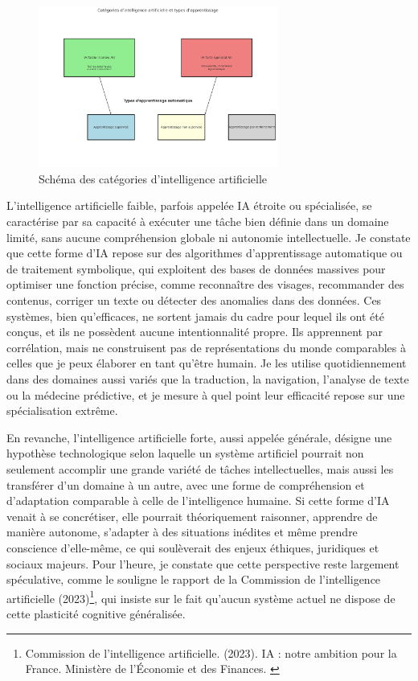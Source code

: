 \documentclass[11pt,a4paper]{report}
\begin{document}
\begin{figure}[h]
    \centering
    \includegraphics[width=0.7\textwidth]{images/2.1.1.png}
    \caption{Schéma des catégories d’intelligence artificielle}
    \label{fig:2.1.1}
\end{figure}

L’intelligence artificielle faible, parfois appelée IA étroite ou spécialisée, se caractérise par sa capacité à exécuter une tâche bien définie dans un domaine limité, sans aucune compréhension globale ni autonomie intellectuelle. Je constate que cette forme d’IA repose sur des algorithmes d’apprentissage automatique ou de traitement symbolique, qui exploitent des bases de données massives pour optimiser une fonction précise, comme reconnaître des visages, recommander des contenus, corriger un texte ou détecter des anomalies dans des données. Ces systèmes, bien qu’efficaces, ne sortent jamais du cadre pour lequel ils ont été conçus, et ils ne possèdent aucune intentionnalité propre. Ils apprennent par corrélation, mais ne construisent pas de représentations du monde comparables à celles que je peux élaborer en tant qu’être humain. Je les utilise quotidiennement dans des domaines aussi variés que la traduction, la navigation, l’analyse de texte ou la médecine prédictive, et je mesure à quel point leur efficacité repose sur une spécialisation extrême.

En revanche, l’intelligence artificielle forte, aussi appelée générale, désigne une hypothèse technologique selon laquelle un système artificiel pourrait non seulement accomplir une grande variété de tâches intellectuelles, mais aussi les transférer d’un domaine à un autre, avec une forme de compréhension et d’adaptation comparable à celle de l’intelligence humaine. Si cette forme d’IA venait à se concrétiser, elle pourrait théoriquement raisonner, apprendre de manière autonome, s’adapter à des situations inédites et même prendre conscience d’elle-même, ce qui soulèverait des enjeux éthiques, juridiques et sociaux majeurs. Pour l’heure, je constate que cette perspective reste largement spéculative, comme le souligne le rapport de la Commission de l’intelligence artificielle (2023)\footnote{Commission de l’intelligence artificielle. (2023). IA : notre ambition pour la France. Ministère de l’Économie et des Finances. \cite{iagouv}}, qui insiste sur le fait qu’aucun système actuel ne dispose de cette plasticité cognitive généralisée.
\end{document}
